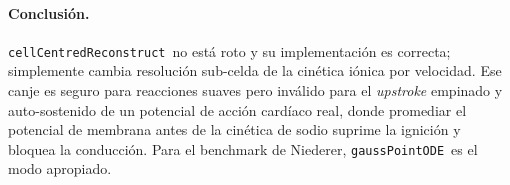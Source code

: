 \documentclass[11pt,a4paper]{article}
\newcommand{\code}[1]{\texttt{\small #1}}
\newcommand{\gpode}{\code{gaussPointODE}}
\newcommand{\ccrec}{\code{cellCentredReconstruct}}
\begin{document}
\paragraph{Conclusión.} \ccrec\ no está roto y su implementación es correcta;
simplemente cambia resolución sub-celda de la cinética iónica por velocidad. Ese
canje es seguro para reacciones suaves pero inválido para el \emph{upstroke}
empinado y auto-sostenido de un potencial de acción cardíaco real, donde promediar
el potencial de membrana antes de la cinética de sodio suprime la ignición y
bloquea la conducción. Para el benchmark de Niederer, \gpode\ es el modo apropiado.
\end{document}
